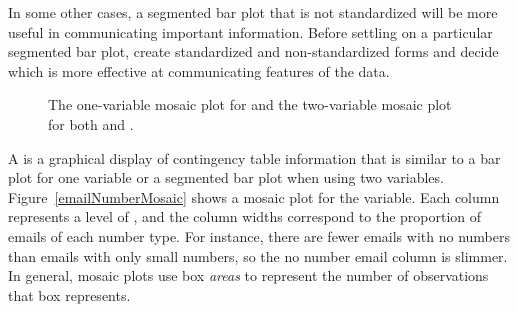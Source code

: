 In some other cases, a segmented bar plot that is not standardized will be more useful in communicating important information. Before settling on a particular segmented bar plot, create standardized and non-standardized forms and decide which is more effective at communicating features of the data.

\begin{figure}
\centering
{}
\caption{The one-variable mosaic plot for  and the two-variable mosaic plot for both  and .}
\label{emailSpamNumberMosaicPlot}
\end{figure}

A  is a graphical display of contingency table information that is similar to a bar plot for one variable or a segmented bar plot when using two variables. Figure~\ref{emailNumberMosaic} shows a mosaic plot for the  variable. Each column represents a level of , and the column widths correspond to the proportion of emails of each number type. For instance, there are fewer emails with no numbers than emails with only small numbers, so the no number email column is slimmer. In general, mosaic plots use box \emph{areas} to represent the number of observations that box represents.

